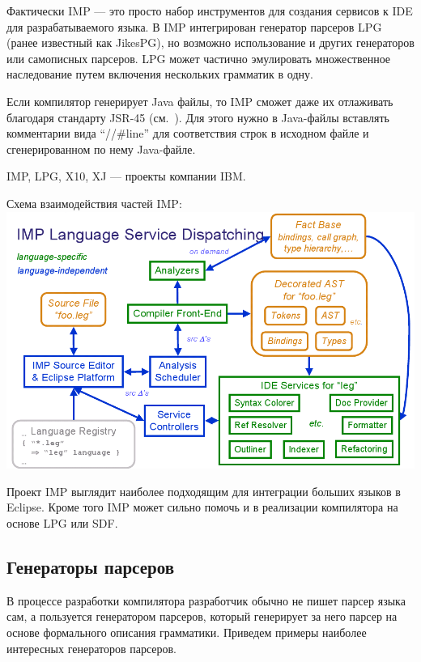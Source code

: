 \documentclass[a4paper,12pt,titlepage]{extarticle}
\begin{document}
Фактически IMP --- это просто набор инструментов для создания сервисов к IDE для
разрабатываемого языка. В IMP интегрирован генератор парсеров LPG (ранее
известный как JikesPG), но возможно использование и других генераторов или
самописных парсеров. LPG может частично эмулировать множественное наследование
путем включения нескольких грамматик в одну.

Если компилятор генерирует Java файлы, то IMP сможет даже их отлаживать
благодаря стандарту JSR-45 (см.~\cite{JSR45}). Для этого нужно в Java-файлы
вставлять комментарии вида ``//\#line'' для соответствия строк в исходном файле и
сгенерированном по нему Java-файле.

IMP, LPG, X10, XJ --- проекты компании IBM.

\pagebreak
\begin{center}
Схема взаимодействия частей IMP:
\includegraphics[scale=0.5]{img/imp.png}
\end{center}

Проект IMP выглядит наиболее подходящим для интеграции больших языков в Eclipse.
Кроме того IMP может сильно помочь и в реализации компилятора на основе LPG или
SDF.

\subsection{Генераторы парсеров}
В процессе разработки компилятора разработчик обычно не пишет парсер языка сам,
а пользуется генератором парсеров, который генерирует за него парсер на основе
формального описания грамматики. Приведем примеры наиболее интересных
генераторов парсеров.
\end{document}
